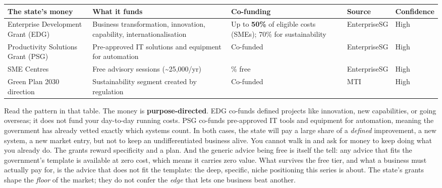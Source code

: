 \documentclass[10pt,twoside,openany]{memoir}
\renewcommand{\arraystretch}{1.1}
\begin{document}
{{{{{{{{{{{\def\LTcaptype{none} %
{\renewcommand{\arraystretch}{0.9}\begin{longtable}[]{@{}
  >{\raggedright\arraybackslash}p{}
  >{\raggedright\arraybackslash}p{}
  >{\raggedright\arraybackslash}p{}
  >{\raggedright\arraybackslash}p{}
  >{\raggedright\arraybackslash}p{}@{}}
\toprule\noalign{}
\begin{minipage}[b]{\linewidth}\raggedright
The state's money
\end{minipage} & \begin{minipage}[b]{\linewidth}\raggedright
What it funds
\end{minipage} & \begin{minipage}[b]{\linewidth}\raggedright
Co-funding
\end{minipage} & \begin{minipage}[b]{\linewidth}\raggedright
Source
\end{minipage} & \begin{minipage}[b]{\linewidth}\raggedright
Confidence
\end{minipage} \\
\midrule\noalign{}
\endhead
\bottomrule\noalign{}
\endlastfoot
Enterprise Development Grant (EDG) & Business transformation,
innovation, capability, internationalisation & Up to \textbf{50\%} of
eligible costs (SMEs); 70\% for sustainability & EnterpriseSG & High \\
Productivity Solutions Grant (PSG) & Pre-approved IT solutions and
equipment for automation & Co-funded & EnterpriseSG & High \\
SME Centres & Free advisory sessions (\textasciitilde25,000/yr) & 100\%
free & EnterpriseSG & High \\
Green Plan 2030 direction & Sustainability segment created by regulation
& Co-funded & MTI & High \\
\end{longtable}
}

Read the pattern in that table. The money is \textbf{purpose-directed}.
EDG co-funds defined projects like innovation, new capabilities, or
going overseas; it does not fund your day-to-day running costs. PSG
co-funds pre-approved IT tools and equipment for automation, meaning the
government has already vetted exactly which systems count. In both
cases, the state will pay a large share of a \emph{defined} improvement,
a new system, a new market entry, but not to keep an undifferentiated
business alive. You cannot walk in and ask for money to keep doing what
you already do. The grants reward specificity and a plan. And the
generic advice being free is itself the tell: any advice that fits the
government's template is available at zero cost, which means it carries
zero value. What survives the free tier, and what a business must
actually pay for, is the advice that does not fit the template: the
deep, specific, niche positioning this series is about. The state's
grants shape the \emph{floor} of the market; they do not confer the
\emph{edge} that lets one business beat another.

}}}}}}}}}}}
\end{document}
